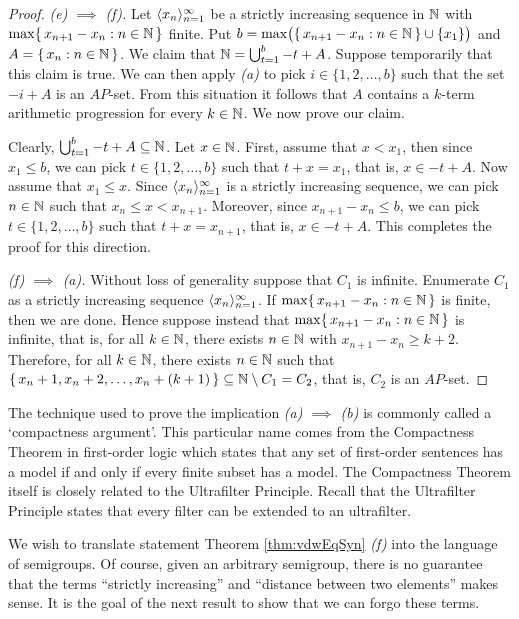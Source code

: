 \begin{proof}
  \textsl{(e) $\implies$ (f).}
  Let $\langle x_n \rangle_{n=1}^\infty$ be a strictly increasing sequence in $\mathbb{N}$ with $\max\{\, x_{n+1} - x_n : n \in \mathbb{N} \,\}$ finite. 
  Put $b =\max\bigl(\{\, x_{n+1} - x_n : n \in \mathbb{N} \,\} \cup \{x_1\}\bigr)$ and $A = \{\, x_n : n \in \mathbb{N} \,\}$. 
  We claim that $\mathbb{N} = \bigcup_{t=1}^b -t+A$. 
  Suppose temporarily that this claim is true.
  We can then apply \textsl{(a)} to pick $i \in \{1, 2, \ldots, b\}$ such that the set $-i + A$ is an $AP$-set. 
  From this situation it follows that $A$ contains a $k$-term arithmetic progression for every $k \in \mathbb{N}$. 
  We now prove our claim.
  
  Clearly, $\bigcup_{t=1}^b -t+A \subseteq \mathbb{N}$.
  Let $x \in \mathbb{N}$.
  First, assume that $x < x_1$, then since $x_1 \le b$, we can pick $t \in \{1, 2, \ldots, b\}$ such that $t + x = x_1$, that is, $x \in -t+A$.
  Now assume that $x_1 \le x$.
  Since $\langle x_n \rangle_{n=1}^\infty$ is a strictly increasing sequence, we can pick $n \in \mathbb{N}$ such that $x_n \le x < x_{n+1}$.
  Moreover, since $x_{n+1} - x_n \le b$, we can pick $t \in \{1, 2, \ldots, b\}$ such that $t + x = x_{n+1}$, that is, $x \in -t + A$. 
  This completes the proof for this direction. 

  \textsl{(f) $\implies$ (a).}
  Without loss of generality suppose that $C_1$ is infinite.
  Enumerate $C_1$ as a strictly increasing sequence $\langle x_n \rangle_{n=1}^\infty$. 
  If $\max\{\, x_{n+1} - x_n : n \in \mathbb{N} \,\}$ is finite, then we are done. 
  Hence suppose instead that $\max\{\, x_{n+1} - x_n : n \in \mathbb{N} \,\}$ is infinite, that is, for all $k \in \mathbb{N}$, there exists $n \in \mathbb{N}$ with $x_{n+1} - x_n \ge k + 2$. 
  Therefore, for all $k \in \mathbb{N}$, there exists $n \in \mathbb{N}$ such that $\{\, x_n + 1, x_n + 2, \ldots, x_n + (k + 1) \,\} \subseteq \mathbb{N} \setminus C_1 = C_2$, that is, $C_2$ is an $AP$-set.
\end{proof}
\begin{rmk}
  The technique used to prove the implication \textsl{(a) $\implies$ (b)} is commonly called a `compactness argument'. 
  This particular name comes from the Compactness Theorem in first-order logic which states that any set of first-order sentences has a model if and only if every finite subset has a model. 
  The Compactness Theorem itself is closely related to the Ultrafilter Principle. 
  Recall that the Ultrafilter Principle states that every filter can be extended to an ultrafilter.
\end{rmk}

We wish to translate statement Theorem \ref{thm:vdwEqSyn} \textsl{(f)} into the language of semigroups.
Of course, given an arbitrary semigroup, there is no guarantee that the terms ``strictly increasing'' and ``distance between two elements'' makes sense.
It is the goal of the next result to show that we can forgo these terms.

